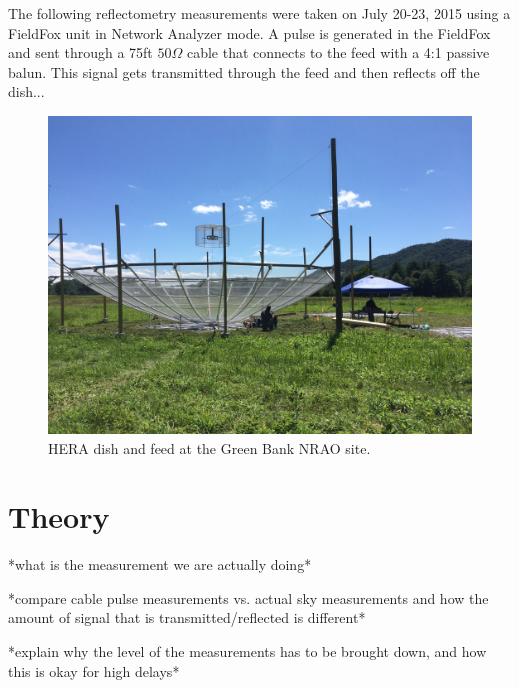 \documentclass[12pt,preprint]{aastex}
\begin{document}
The following reflectometry measurements were taken on July 20-23, 2015 using a
FieldFox unit in Network Analyzer mode. A pulse is generated in the FieldFox
and sent through a 75ft $50\Omega$ cable that connects to the feed with a 4:1
passive balun. This signal gets transmitted through the feed and then reflects
off the dish...



\begin{figure}
\centering
\includegraphics[trim={2cm 20cm 30cm 15cm},clip, totalheight=0.45\textheight]{plots/heradish.jpg}
\caption{HERA dish and feed at the Green Bank NRAO site.}
\label{fig:heradish}
\end{figure}

\section{Theory}

*what is the measurement we are actually doing*

*compare cable pulse measurements vs. actual sky measurements and how the amount of signal that is transmitted/reflected is different*

*explain why the level of the measurements has to be brought down, and how this is okay for high delays*
\end{document}
